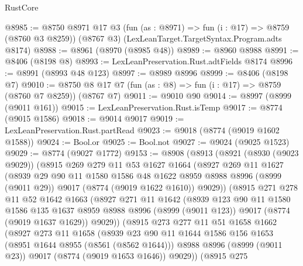 \begin{lexlean}{RustCore}
\begin{coremodule}
@8985 := @8750
    @8971
    @17
    @3
    (fun (as : @8971) => fun (i : @17) => @8759 (@8760 @3 @8259))
    (@8767 @3)
    (LexLeanTarget.TargetSyntax.Program.adts @8174)
@8988 := @8961 (@8970 (@8985 @48))
@8989 := @8960 @8988
@8991 := @8406 (@8198 @8)
@8993 := LexLeanPreservation.Rust.adtFields @8174
@8996 := @8991 (@8993 @48 @123)
@8997 := @8989 @8996
@8999 := @8406 (@8198 @7)
@9010 := @8750 @8 @17 @7 (fun (as : @8) => fun (i : @17) => @8759 (@8760 @7 @8259)) (@8767 @7)
@9011 := @9010 @90
@9014 := @8997 (@8999 (@9011 @161))
@9015 := LexLeanPreservation.Rust.isTemp
@9017 := @8774 (@9015 @1586)
@9018 := @9014 @9017
@9019 := LexLeanPreservation.Rust.partRead
@9023 := @9018 (@8774 (@9019 @1602 @1588))
@9024 := Bool.or
@9025 := Bool.not
@9027 := @9024 (@9025 @1523)
@9029 := @8774 (@9027 @1772)
@9153 := @8908
    (@8913
      (@8921
        (@8930 (@9023 @9029))
        (@8915
          @269
          @279
          @11
          @53
          @1627
          @1664
          (@8927
            @269
            @11
            @1627
            (@8939
              @29
              @90
              @11
              @1580
              @1586
              @48
              @1622
              @8959
              @8988
              @8996
              (@8999 (@9011 @29))
              @9017
              (@8774 (@9019 @1622 @1610))
              @9029))
          (@8915
            @271
            @278
            @11
            @52
            @1642
            @1663
            (@8927
              @271
              @11
              @1642
              (@8939
                @123
                @90
                @11
                @1580
                @1586
                @135
                @1637
                @8959
                @8988
                @8996
                (@8999 (@9011 @123))
                @9017
                (@8774 (@9019 @1637 @1629))
                @9029))
            (@8915
              @273
              @277
              @11
              @51
              @1658
              @1662
              (@8927
                @273
                @11
                @1658
                (@8939
                  @23
                  @90
                  @11
                  @1644
                  @1586
                  @156
                  @1653
                  (@8951 @1644 @8955 (@8561 (@8562 @1644)))
                  @8988
                  @8996
                  (@8999 (@9011 @23))
                  @9017
                  (@8774 (@9019 @1653 @1646))
                  @9029))
              (@8915
                @275

\end{coremodule}
\end{lexlean}
